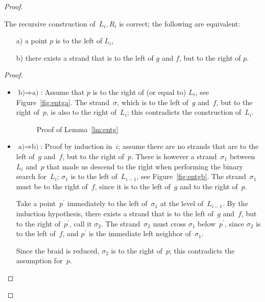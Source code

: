 \documentclass[a4paper,11pt]{article}
\begin{document}
\begin{proof}
\begin{lemma} \label{lm:entg}
	The recursive construction of~\(L_i, R_i\) is correct;
	the following are equivalent:
   \begin{itemize}
	\item[a)] a point \(p\) is to the left of \(L_i\),
	\item[b)] there exists a strand that is to the left of \(g\) and \(f\),
	  but to the right of \(p\).
   \end{itemize}
\end{lemma}

\begin{proof} \begin{itemize}
	\item \( \text{b)} \Rightarrow \text{a)} \): Assume that \(p\) is
	to the right of (or equal to) \(L_i\), see Figure~\ref{fig:entga}.
	The strand~\(\sigma\), which is to the left of~\(g\) and~\(f\), but
	to the right of~\(p\), is also to the right of~\(L_i\); this contradicts
	the construction of~\(L_i\). 

\begin{figure}[ht] \centering
   
   \caption{Proof of Lemma~\ref{lm:entg}}
\end{figure}

	\item \( \text{a)} \Rightarrow \text{b)} \): Proof by induction in~\(i\);
	assume there are no strands that are to the left of~\(g\) and~\(f\),
	but to the right of~\(p\). There is however a strand~\(\sigma_1\)
	between~\(L_i\) and~\(p\) that made us descend to the right when performing
	the binary search for~\(L_i\); \(\sigma_1\) is to the left of~\(L_{i-1}\),
	see Figure~\ref{fig:entgb}. The strand~\(\sigma_1\) must be
	to the right of~\(f\), since it is to the left of~\(g\)
	and to the right of~\(p\).

	Take a point~\(p^\prime\) immediately to the left of~\(\sigma_1\)
	at the level of~\(L_{i-1}\). By the induction hypothesis, there exists a strand
	that is to the left of~\(g\) and~\(f\), but to the right of~\(p^\prime\),
	call it \(\sigma_2\). The strand~\(\sigma_2\) must cross \(\sigma_1\)
	below~\(p^\prime\), since \(\sigma_2\) is to the left of~\(f\), and \(p^\prime\)
	is the immediate left neighbor of~\(\sigma_1\).

	Since the braid is reduced, \(\sigma_2\) is to the right of~\(p\);
	this contradicts the assumption for~\(p\).
\end{itemize} \end{proof}


\end{proof}
\end{document}
